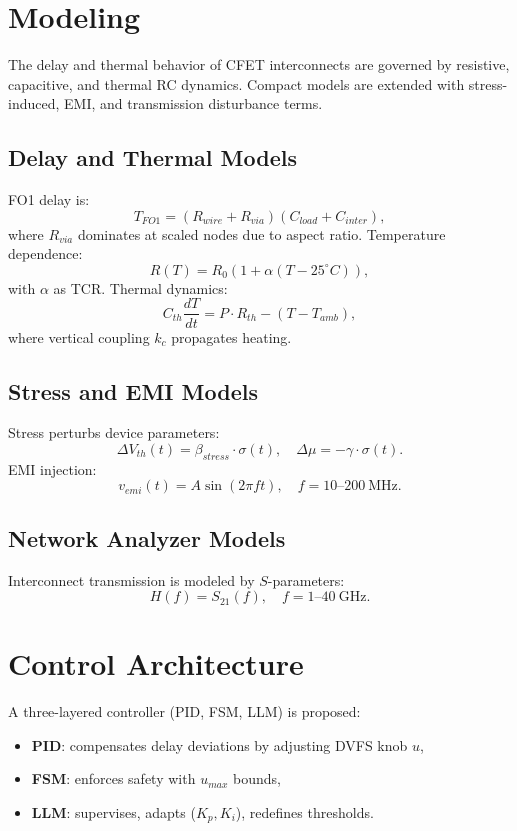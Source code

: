 \documentclass[conference]{IEEEtran}
\begin{document}
\section{Modeling}
The delay and thermal behavior of CFET interconnects are governed by resistive, capacitive, and thermal RC dynamics. 
Compact models are extended with stress-induced, EMI, and transmission disturbance terms.

\subsection{Delay and Thermal Models}
FO1 delay is:
\begin{equation}
T_{FO1} = (R_{wire}+R_{via})(C_{load}+C_{inter}),
\end{equation}
where $R_{via}$ dominates at scaled nodes due to aspect ratio.
Temperature dependence:
\begin{equation}
R(T) = R_0 \left(1 + \alpha(T-25^{\circ}C)\right),
\end{equation}
with $\alpha$ as TCR. Thermal dynamics:
\begin{equation}
C_{th}\frac{dT}{dt} = P \cdot R_{th} - (T - T_{amb}),
\end{equation}
where vertical coupling $k_c$ propagates heating.

\subsection{Stress and EMI Models}
Stress perturbs device parameters:
\begin{equation}
\Delta V_{th}(t) = \beta_{stress}\cdot \sigma(t), \quad \Delta \mu = -\gamma \cdot \sigma(t).
\end{equation}
EMI injection:
\begin{equation}
v_{emi}(t) = A\sin(2\pi ft), \quad f=10\text{--}200~\text{MHz}.
\end{equation}

\subsection{Network Analyzer Models}
Interconnect transmission is modeled by $S$-parameters:
\begin{equation}
H(f) = S_{21}(f), \quad f=1\text{--}40~\text{GHz}.
\end{equation}

\section{Control Architecture}
A three-layered controller (PID, FSM, LLM) is proposed:
\begin{itemize}
    \item \textbf{PID}: compensates delay deviations by adjusting DVFS knob $u$,
    \item \textbf{FSM}: enforces safety with $u_{max}$ bounds,
    \item \textbf{LLM}: supervises, adapts ($K_p,K_i$), redefines thresholds.
\end{itemize}
\end{document}
